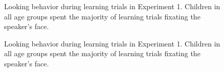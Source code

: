 \documentclass[man,floatsintext]{apa6}
\begin{document}
\begin{figure}[tb]
	\caption{\label{fig:exp1and2_test_spaghetti} Looking behavior during learning trials in Experiment 1. Children in all age groups spent the majority of learning trials fixating the speaker's face.}
\end{figure}

\begin{figure}[tb]
	\caption{\label{fig:exp1and2_split} Looking behavior during learning trials in Experiment 1. Children in all age groups spent the majority of learning trials fixating the speaker's face.}
\end{figure}
\end{document}
